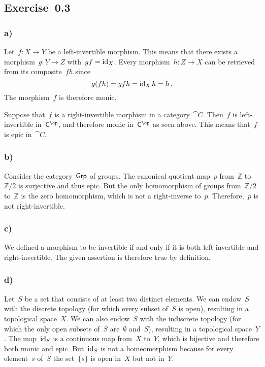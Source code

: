 \subsection{Exercise~0.3}
\label{exercise 0.3}



\subsubsection{a)}

Let~$f \colon X \to Y$ be a left-invertible morphism.
This means that there exists a morphism~$g \colon Y \to Z$ with~$g f = \operatorname{id}_X$.
Every morphism~$h \colon Z \to X$ can be retrieved from its composite~$f h$ since
\[
	g (f h) = g f h = \operatorname{id}_X h = h \,.
\]
The morphism~$f$ is therefore monic.

Suppose that~$f$ is a right-invertible morphism in a category~$\cat{C}$.
Then~$f$ is left-invertible in~$\cat{C}^{\op}$, and therefore monic in~$\cat{C}^{\op}$ as seen above.
This means that~$f$ is epic in~$\cat{C}$.



\subsubsection{b)}

Consider the category~$\mathsf{Grp}$ of groups.
The canonical quotient map~$p$ from~$ℤ$ to~$ℤ/2$ is surjective and thus epic.
But the only homomorphism of groups from~$ℤ/2$ to~$ℤ$ is the zero homomorphism, which is not a right-inverse to~$p$.
Therefore,~$p$ is not right-invertible.



\subsubsection{c)}

We defined a morphism to be invertible if and only if it is both left-invertible and right-invertible.
The given assertion is therefore true by definition.



\subsubsection{d)}

Let~$S$ be a set that consists of at least two distinct elements.
We can endow~$S$ with the discrete topology (for which every subset of~$S$ is open), resulting in a topological space~$X$.
We can also endow~$S$ with the indiscrete topology (for which the only open subsets of~$S$ are~$∅$ and~$S$), resulting in a topological space~$Y$.
The map~$\operatorname{id}_S$ is a continuous map from~$X$ to~$Y$, which is bijective and therefore both monic and epic.
But~$\operatorname{id}_S$ is not a homeomorphism because for every element~$s$ of~$S$ the set~$\{ s \}$ is open in~$X$ but not in~$Y$.



